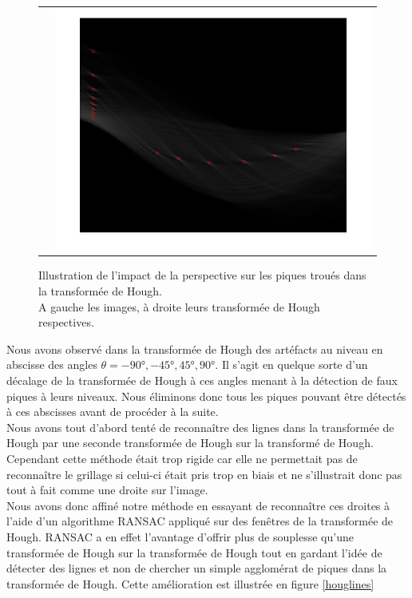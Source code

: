 \begin{figure}[h]
\begin{center}
\begin{tabular}{cc}
& \includegraphics[scale=0.2]{fig/perspectivehough.png}
\end{tabular}
\caption{\label{houghlines} Illustration de l'impact de la perspective sur les piques troués dans la transformée de Hough. \\A gauche les images, à droite leurs transformée de Hough respectives. }
\end{center}
\end{figure}

Nous avons observé dans la transformée de Hough des artéfacts au niveau en abscisse des angles $\theta=-90\text{°},-45\text{°},45\text{°},90\text{°}$. Il s'agit en quelque sorte d'un décalage de la transformée de Hough à ces angles menant à la détection de faux piques à leurs niveaux. Nous éliminons donc tous les piques pouvant être détectés à ces abscisses avant de procéder à la suite.
\\

Nous avons tout d'abord tenté de reconnaître des lignes dans la transformée de Hough par une seconde transformée de Hough sur la transformé de Hough. Cependant cette méthode était trop rigide car elle ne permettait pas de reconnaître le grillage si celui-ci était pris trop en biais et ne s'illustrait donc pas tout à fait comme une droite sur l'image.
\\

Nous avons donc affiné notre méthode en essayant de reconnaître ces droites à l'aide d'un algorithme RANSAC appliqué sur des fenêtres de la transformée de Hough. RANSAC a en effet l'avantage d'offrir plus de souplesse qu'une transformée de Hough sur la transformée de Hough tout en gardant l'idée de détecter des lignes et non de chercher un simple agglomérat de piques dans la transformée de Hough. Cette amélioration est illustrée en figure \ref{houglines}

